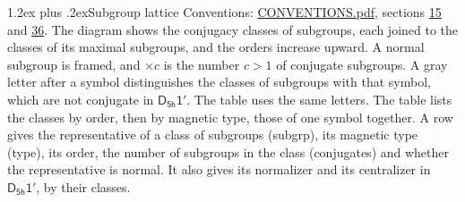 \documentclass[10pt,a4paper]{article}
\makeatletter
\renewcommand\section{\@startsection{section}{1}{\z@}{-3ex plus -1ex minus -.2ex}%
  {1.2ex plus .2ex}{\normalfont\large\sffamily\bfseries\color{parttitle}}}
\numberwithin{equation}{section}
\newcommand{\grp}[1]{\mathsf{#1}}
\makeatother
\begin{document}
\section{Subgroup lattice}\label{s:subgroups}
Conventions: \href{../../CONVENTIONS.pdf}{CONVENTIONS.pdf}, sections \href{../../../rotation/CONVENTIONS.pdf\#conv.15}{15} and \href{../../CONVENTIONS.pdf\#conv.36}{36}.
The diagram shows the conjugacy classes of subgroups, each joined to the classes of its maximal subgroups, and the orders increase upward. \label{n:index.conjugates.c}\label{n:mark.conjugates}A normal subgroup is framed, and ${\times}c$ is the number $c > 1$ of conjugate subgroups. \label{n:mark.letter}A gray letter after a symbol distinguishes the classes of subgroups with that symbol, which are not conjugate in $\grp{D_{5h}1'}$. The table uses the same letters. The table lists the classes by order, then by magnetic type, those of one symbol together. \label{n:head.subgroup}\label{n:head.magnetic.type}\label{n:head.order}\label{n:head.conjugates}\label{n:head.normal}A row gives the representative of a class of subgroups (subgrp), its magnetic type (type), its order, the number of subgroups in the class (conjugates) and whether the representative is normal. \label{n:head.normalizer}\label{n:head.centralizer}It also gives its normalizer and its centralizer in $\grp{D_{5h}1'}$, by their classes. 
\end{document}
